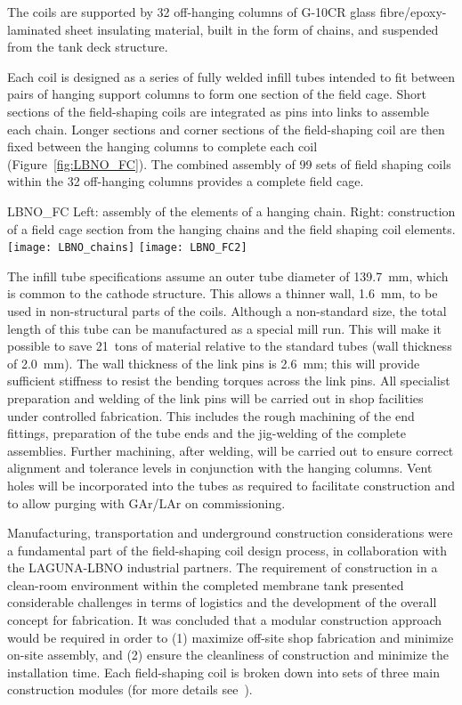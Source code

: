 The coils are supported by 32 off-hanging columns of G-10CR glass
fibre/epoxy-laminated sheet insulating material, built in the form of
chains, and suspended from the tank deck structure.

Each coil is designed as a series of fully welded infill tubes
intended to fit between pairs of hanging support columns to form one
section of the field cage.  Short sections of the field-shaping coils
are integrated as pins into links to assemble each chain.  Longer
sections and corner sections of the field-shaping coil are then fixed
between the hanging columns to complete each coil
(Figure~\ref{fig:LBNO_FC}). The combined assembly of 99 sets of field
shaping coils within the 32 off-hanging columns provides a complete
field cage.
\begin{cdrfigure}{LBNO_FC}
{\small Left: assembly of the elements of a hanging chain. Right: 
construction of a field cage section from the hanging chains and the field shaping coil elements.}
\texttt{[image: LBNO\_chains]} \hfill
\texttt{[image: LBNO\_FC2]}
\end{cdrfigure}

The infill tube specifications assume an outer tube diameter of 139.7~mm,
which is common to the cathode structure.  This allows a thinner wall,
1.6~mm, to be used in non-structural parts of the coils.  Although a
non-standard size, the total length of this tube can be manufactured
as a special mill run.  This will make it possible to save 21~tons of
material relative to the standard tubes (wall thickness of
2.0~mm). The wall thickness of the link pins is 2.6~mm; this will
provide sufficient stiffness to resist the bending torques across
the link pins.  All specialist preparation and welding of the link
pins will be carried out in shop facilities under controlled
fabrication.  This includes the rough machining of the end fittings,
preparation of the tube ends and the jig-welding of the complete
assemblies. Further machining, after welding, will be carried out to
ensure correct alignment and tolerance levels in conjunction with the
hanging columns.  Vent holes will be incorporated into the tubes as
required to facilitate construction and to allow purging with GAr/LAr
on commissioning.

Manufacturing, transportation and underground construction
considerations were a fundamental part of the field-shaping coil
design process, in collaboration with the LAGUNA-LBNO industrial
partners. The requirement of construction in a clean-room environment
within the completed membrane tank presented considerable challenges
in terms of logistics and the development of the overall concept for
fabrication.  It was concluded that a modular construction approach
would be required in order to (1) maximize off-site shop fabrication
and minimize on-site assembly, and (2) ensure the cleanliness of
construction and minimize the installation time.
Each field-shaping coil is broken down into sets of three main construction modules
(for more details see~\cite{cdr-annex-lbno-2}). 

